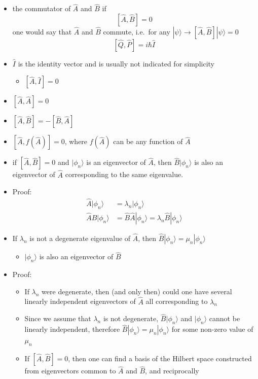 \documentclass[a4paper,11pt,normalem]{article}
\begin{document}
\begin{itemize}
\item
  the commutator of \(\hat{A}\) and \(\hat{B}\) if
\[
    [\hat{A},\hat{B}] = 0
\]
one would say that \(\hat{A}\) and \(\hat{B}\) commute, i.e.~for any
\(|\psi\rangle \to [\hat{A},\hat{B}]|\psi\rangle = 0\)
\[
    [\hat{Q},\hat{P}] = i\hbar\hat{I}
\]
\item
  \(\hat{I}\) is the identity vector and is usually not indicated for
  simplicity
  \begin{itemize}
  \item
    \([\hat{A},\hat{I}] = 0\)
  \end{itemize}
\item
  \([\hat{A},\hat{A}] = 0\)
\item
  \([\hat{A},\hat{B}] = -[\hat{B},\hat{A}]\)
\item
  \([\hat{A},f(\hat{A})] = 0\), where \(f(\hat{A})\) can be any function
  of \(\hat{A}\)
\item
  if \([\hat{A},\hat{B}] = 0\) and \(|\phi_n\rangle\) is an eigenvector
  of \(\hat{A}\), then \(\hat{B}|\phi_n\rangle\) is also an eigenvector
  of \(\hat{A}\) corresponding to the same eigenvalue.
\item
  Proof:
\[
    \begin{aligned}
    \hat{A}|\phi_n\rangle &= \lambda_n|\phi_n\rangle \\
    \hat{A}\hat{B}|\phi_n\rangle &= \hat{B}\hat{A}|\phi_n\rangle = \lambda_n\hat{B}|\phi_n\rangle
    \end{aligned}
\]
\item
  If \(\lambda_n\) is not a degenerate eigenvalue of \(\hat{A}\), then
  \(\hat{B}|\phi_n\rangle = \mu_n|\phi_n\rangle\)
  \begin{itemize}
  \item
    \(|\phi_n\rangle\) is also an eigenvector of \(\hat{B}\)
  \end{itemize}
\item
  Proof:
  \begin{itemize}
  \item
    If \(\lambda_n\) were degenerate, then (and only then) could one
    have several linearly independent eigenvectors of \(\hat{A}\) all
    corresponding to \(\lambda_n\)
  \item
    Since we assume that \(\lambda_n\) is not degenerate,
    \(\hat{B}|\phi_n\rangle\) and \(|\phi_n\rangle\) cannot be linearly
    independent, therefore
    \(\hat{B}|\phi_n\rangle = \mu_n|\phi_n\rangle\) for some non-zero
    value of \(\mu_n\)
  \item
    If \([\hat{A},\hat{B}] = 0\), then one can find a basis of the
    Hilbert space constructed from eigenvectors common to \(\hat{A}\)
    and \(\hat{B}\), and reciprocally
  \end{itemize}
\end{itemize}
\end{document}

